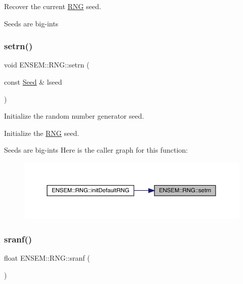 Recover the current \mbox{\hyperlink{namespaceENSEM_1_1RNG}{R\+NG}} seed.

Seeds are big-\/ints \mbox{\label{namespaceENSEM_1_1RNG_ad0ec5508fb072a32d96927e5b752164a}} 
\subsubsection{\texorpdfstring{setrn()}{setrn()}}
{\footnotesize\ttfamily void E\+N\+S\+E\+M\+::\+R\+N\+G\+::setrn (\begin{DoxyParamCaption}\item[{const \mbox{\hyperlink{group__defs_ga8a5a983ab64ca8f6a5419885bacd4c40}{Seed}} \&}]{lseed }\end{DoxyParamCaption})}



Initialize the random number generator seed. 

Initialize the \mbox{\hyperlink{namespaceENSEM_1_1RNG}{R\+NG}} seed.

Seeds are big-\/ints Here is the caller graph for this function\+:\nopagebreak
\begin{figure}[H]
\begin{center}
\leavevmode
\includegraphics[width=350pt]{d8/d9c/namespaceENSEM_1_1RNG_ad0ec5508fb072a32d96927e5b752164a_icgraph}
\end{center}
\end{figure}
\mbox{\label{namespaceENSEM_1_1RNG_a169ccd1627df1ad9983c4ce344d0e36a}} 
\subsubsection{\texorpdfstring{sranf()}{sranf()}}
{\footnotesize\ttfamily float E\+N\+S\+E\+M\+::\+R\+N\+G\+::sranf (\begin{DoxyParamCaption}{ }\end{DoxyParamCaption})}



